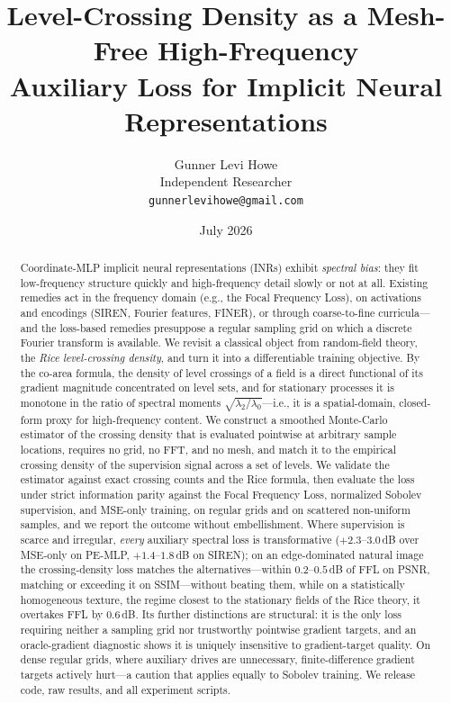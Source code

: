 \documentclass[10pt]{article}
\title{Level-Crossing Density as a Mesh-Free High-Frequency\\
Auxiliary Loss for Implicit Neural Representations}
\author{%
Gunner Levi Howe\\
Independent Researcher\\
\texttt{gunnerlevihowe@gmail.com}%
}
\date{July 2026}
\begin{document}
\maketitle

\begin{abstract}
Coordinate-MLP implicit neural representations (INRs) exhibit \emph{spectral bias}: they
fit low-frequency structure quickly and high-frequency detail slowly or not at all.
Existing remedies act in the frequency domain (e.g., the Focal Frequency Loss), on
activations and encodings (SIREN, Fourier features, FINER), or through coarse-to-fine
curricula---and the loss-based remedies presuppose a regular sampling grid on which a
discrete Fourier transform is available. We revisit a classical object from random-field
theory, the \emph{Rice level-crossing density}, and turn it into a differentiable
training objective. By the co-area formula, the density of level crossings of a field is
a direct functional of its gradient magnitude concentrated on level sets, and for
stationary processes it is monotone in the ratio of spectral moments
$\sqrt{\lambda_2/\lambda_0}$---i.e., it is a spatial-domain, closed-form proxy for
high-frequency content. We construct a smoothed Monte-Carlo estimator of the crossing
density that is evaluated pointwise at arbitrary sample locations, requires no grid, no
FFT, and no mesh, and match it to the empirical crossing density of the supervision
signal across a set of levels. We validate the estimator against exact crossing counts
and the Rice formula, then evaluate the loss under strict information parity against
the Focal Frequency Loss, normalized Sobolev supervision, and MSE-only training, on
regular grids and on scattered non-uniform samples, and we report the outcome without
embellishment. Where supervision is scarce and irregular, \emph{every} auxiliary
spectral loss is transformative ($+2.3$--$3.0$\,dB over MSE-only on PE-MLP,
$+1.4$--$1.8$\,dB on SIREN); on an edge-dominated natural image the crossing-density
loss matches the alternatives---within $0.2$--$0.5$\,dB of FFL on PSNR, matching or
exceeding it on SSIM---without beating them, while on a statistically homogeneous
texture, the regime closest to the stationary fields of the Rice theory, it overtakes
FFL by $0.6$\,dB. Its further distinctions are structural:
it is the only loss requiring neither a sampling grid nor trustworthy pointwise
gradient targets, and an oracle-gradient diagnostic shows it is uniquely insensitive
to gradient-target quality. On dense regular grids, where auxiliary drives are
unnecessary, finite-difference gradient targets actively hurt---a caution that applies
equally to Sobolev training. We release code, raw results, and all experiment
scripts.
\end{abstract}
\end{document}
